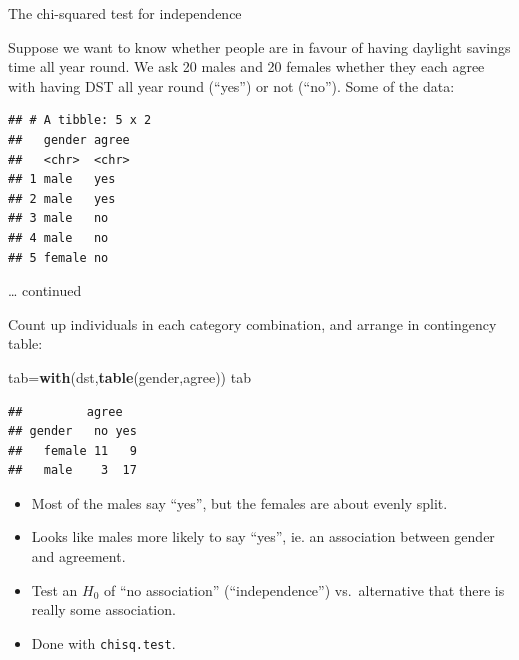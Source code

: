 \documentclass[ignorenonframetext,]{beamer}
\newenvironment{Shaded}{\begin{snugshade}}{\end{snugshade}}
\newcommand{\CommentTok}[1]{\textcolor[rgb]{0.56,0.35,0.01}{\textit{#1}}}
\newcommand{\DecValTok}[1]{\textcolor[rgb]{0.00,0.00,0.81}{#1}}
\newcommand{\KeywordTok}[1]{\textcolor[rgb]{0.13,0.29,0.53}{\textbf{#1}}}
\newcommand{\NormalTok}[1]{#1}
\newcommand{\OperatorTok}[1]{\textcolor[rgb]{0.81,0.36,0.00}{\textbf{#1}}}
\newcommand{\StringTok}[1]{\textcolor[rgb]{0.31,0.60,0.02}{#1}}
\providecommand{\tightlist}{%
  \setlength{\itemsep}{0pt}\setlength{\parskip}{0pt}}
\begin{document}
\begin{frame}[fragile]{The chi-squared test for independence}
\protect\hypertarget{the-chi-squared-test-for-independence}{}

Suppose we want to know whether people are in favour of having daylight
savings time all year round. We ask 20 males and 20 females whether they
each agree with having DST all year round (``yes'') or not (``no'').
Some of the data:

\begin{Shaded}
\end{Shaded}

\begin{verbatim}
## # A tibble: 5 x 2
##   gender agree
##   <chr>  <chr>
## 1 male   yes  
## 2 male   yes  
## 3 male   no   
## 4 male   no   
## 5 female no
\end{verbatim}

\end{frame}

\begin{frame}[fragile]{\ldots{} continued}
\protect\hypertarget{continued-1}{}

Count up individuals in each category combination, and arrange in
contingency table:

\begin{Shaded}
\begin{Highlighting}[]
\NormalTok{tab=}\KeywordTok{with}\NormalTok{(dst,}\KeywordTok{table}\NormalTok{(gender,agree))}
\NormalTok{tab}
\end{Highlighting}
\end{Shaded}

\begin{verbatim}
##         agree
## gender   no yes
##   female 11   9
##   male    3  17
\end{verbatim}

\begin{itemize}
\tightlist
\item
  Most of the males say ``yes'', but the females are about evenly split.
\item
  Looks like males more likely to say ``yes'', ie. an association
  between gender and agreement.
\item
  Test an \(H_0\) of ``no association'' (``independence'')
  vs.~alternative that there is really some association.
\item
  Done with \texttt{chisq.test}.
\end{itemize}

\end{frame}
\end{document}
